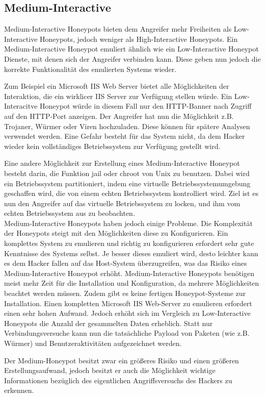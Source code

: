 \subsection{Medium-Interactive}
Medium-Interactive Honeypots bieten dem Angreifer mehr Freiheiten als Low-Interactive Honeypots, jedoch weniger als High-Interactive Honeypots. Ein Medium-Interactive Honeypot emuliert ähnlich wie ein Low-Interactive Honeypot Dienste, mit denen sich der Angreifer verbinden kann. Diese geben nun jedoch die korrekte Funktionalität des emulierten Systems wieder\cite{spitzner.2002a}. 

Zum Beispiel ein Microsoft IIS Web Server bietet alle Möglichkeiten der Interaktion, die ein wirklicer IIS Server zur Verfügung stellen würde. Ein Low-Interacitve Honeypot würde in diesem Fall nur den HTTP-Banner nach Zugriff auf den HTTP-Port anzeigen. Der Angreifer hat nun die Möglichkeit z.B. Trojaner, Würmer oder Viren hochzuladen. Diese können für spätere Analysen verwendet werden. Eine Gefahr besteht für das System nicht, da dem Hacker wieder kein vollständiges Betriebssystem zur Verfügung gestellt wird\cite{spitzner.2002a}.

Eine andere Möglichkeit zur Erstellung eines Medium-Interactive Honeypot besteht darin, die Funktion jail oder chroot von Unix zu benutzen. Dabei wird ein Betriebssystem partitioniert, indem eine virtuelle Betriebssystemumgebung geschaffen wird, die von einem echten Betriebssystem kontrolliert wird. Ziel ist es nun den Angreifer auf das virtuelle Betriebssystem zu locken, und ihm vom echten Betriebssystem aus zu beobachten\cite{spitzner.2002a}. \\

Medium-Interactive Honeypots haben jedoch einige Probleme. Die Komplexität der Honeypots steigt mit den Möglichkeiten diese zu Konfigurieren. Ein komplettes System zu emulieren  und richtig zu konfigurieren erfordert sehr gute Kenntnisse des Systems selbst. Je besser dieses emuliert wird, desto leichter kann es dem Hacker fallen auf das Host-System überzugreifen, was das Risiko eines Medium-Interactive Honeypot erhöht\cite{spitzner.2002a}.
Medium-Interactive Honeypots benötigen meist mehr Zeit für die Installation und Konfiguration, da mehrere Möglichkeiten beachtet werden müssen. Zudem gibt es keine fertigen Honeypot-Systeme zur Installation. Einen kompletten Microsoft IIS Web-Server zu emulieren erfordert einen sehr hohen Aufwand\cite{spitzner.2002a}.
Jedoch erhöht sich im Vergleich zu Low-Interactive Honeypots die Anzahl der gesammelten Daten erheblich. Statt nur Verbindungsversuche kann nun die tatsächliche Payload von Paketen (wie z.B. Würmer) und Benutzeraktivitäten aufgezeichnet werden\cite{spitzner.2002a}.

Der Medium-Honeypot besitzt zwar ein größeres Risiko und einen größeren Erstellungsaufwand, jedoch besitzt er auch die Möglichkeit wichtige Informationen bezüglich des eigentlichen Angriffsversuchs des Hackers zu erkennen\cite{spitzner.2002a}.


